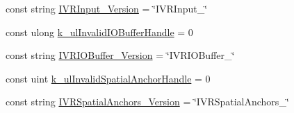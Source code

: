 \begin{DoxyCompactItemize}
\item 
const string \mbox{\hyperlink{class_valve_1_1_v_r_1_1_open_v_r_a9f8cd1adbd4a1b86f4b1ad6410b9c4dd}{I\+V\+R\+Input\+\_\+\+Version}} = \char`\"{}I\+V\+R\+Input\+\_\char`\"{}
\item 
const ulong \mbox{\hyperlink{class_valve_1_1_v_r_1_1_open_v_r_acb5f3d9bbe28d5a564eff6a1afd3e7d3}{k\+\_\+ul\+Invalid\+I\+O\+Buffer\+Handle}} = 0
\item 
const string \mbox{\hyperlink{class_valve_1_1_v_r_1_1_open_v_r_a4599b381ece8e4efc1edad3a335e6100}{I\+V\+R\+I\+O\+Buffer\+\_\+\+Version}} = \char`\"{}I\+V\+R\+I\+O\+Buffer\+\_\char`\"{}
\item 
const uint \mbox{\hyperlink{class_valve_1_1_v_r_1_1_open_v_r_ae08eb34fd2e9792df7d105dee6ee34ae}{k\+\_\+ul\+Invalid\+Spatial\+Anchor\+Handle}} = 0
\item 
const string \mbox{\hyperlink{class_valve_1_1_v_r_1_1_open_v_r_a12536fa4f8456fd687b1f9bfdafe001d}{I\+V\+R\+Spatial\+Anchors\+\_\+\+Version}} = \char`\"{}I\+V\+R\+Spatial\+Anchors\+\_\char`\"{}
\end{DoxyCompactItemize}
